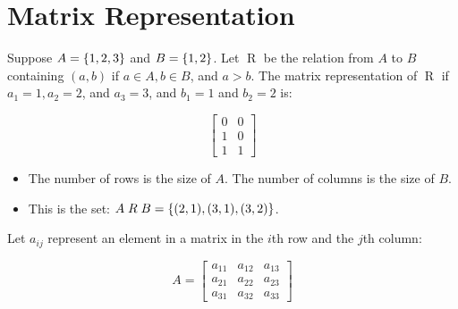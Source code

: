 \documentclass[article, 12pt]{article}
\theoremstyle{definition}
\DeclarePairedDelimiter\set{\{}{\}}
\begin{document}
    \section{Matrix Representation}
    Suppose $A = \set*{1,2,3}$ and $B = \set*{1,2}$. Let $\mathrel{R}$ be the relation from $A$ to $B$ containing $(a,b)$ if $a \in A, b \in B$, and $a > b$. The matrix representation of $\mathrel{R}$ if $a_1 = 1, a_2 = 2$, and $a_3 = 3$, and $b_1 = 1$ and $b_2 = 2$ is:
    \begin{figure}[H]
        \[ \begin{bmatrix}
            0 & 0 \\
            1 & 0 \\
            1 & 1
        \end{bmatrix} \] 
    \end{figure}
    \begin{itemize}
        \item The number of rows is the size of $A$. The number of columns is the size of $B$. 
        \item This is the set: $A \mathrel{R} B = \set*{(2,1), (3,1), (3,2)}$.
    \end{itemize}
    Let $a_{ij}$ represent an element in a matrix in the $i$th row and the $j$th column:
    \begin{figure}[H]
        \[ A = \begin{bmatrix}
            a_{11} & a_{12} & a_{13} \\
            a_{21} & a_{22} & a_{23} \\
            a_{31} & a_{32} & a_{33}
        \end{bmatrix} \]
    \end{figure}
\end{document}
